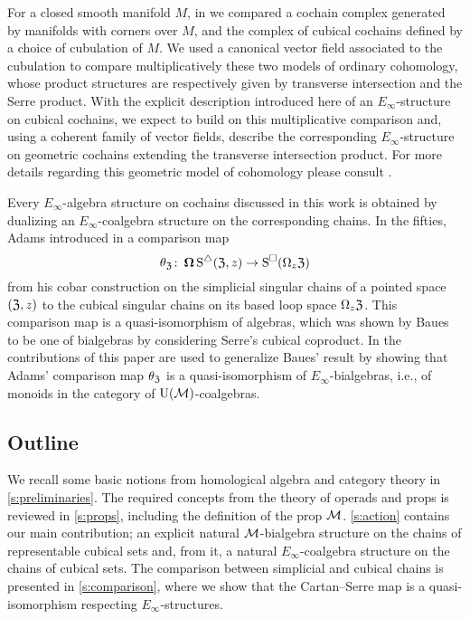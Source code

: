 For a closed smooth manifold $M$, in \cite{medina2021flowing} we compared a cochain complex generated by manifolds with corners over $M$, and the complex of cubical cochains defined by a choice of cubulation of $M$.
We used a canonical vector field associated to the cubulation to compare multiplicatively these two models of ordinary cohomology, whose product structures are respectively given by transverse intersection and the Serre product.
With the explicit description introduced here of an $E_\infty$-structure on cubical cochains, we expect to build on this multiplicative comparison and, using a coherent family of vector fields, describe the corresponding $E_\infty$-structure on geometric cochains extending the transverse intersection product.
For more details regarding this geometric model of cohomology please consult \cite{medina2022foundations}.

Every $E_\infty$-algebra structure on cochains discussed in this work is obtained by dualizing an $E_\infty$-coalgebra structure on the corresponding chains.
In the fifties, Adams introduced in \cite{adams1956cobar} a comparison map
\[
\theta_{\mathfrak{Z}} \colon \operatorname{\mathbf{\Omega}} \operatorname{\operatorname{S}^{\triangle}}(\mathfrak{Z},z) \to \operatorname{\operatorname{S}^{\square}}(\Omega_z \mathfrak{Z})
\]
from his cobar construction on the simplicial singular chains of a pointed space $(\mathfrak{Z},z)$ to the cubical singular chains on its based loop space $\Omega_z \mathfrak{Z}$.
This comparison map is a quasi-isomorphism of algebras, which was shown by Baues \cite{baues1998hopf} to be one of bialgebras by considering Serre's cubical coproduct.
In \cite{medina2021cobar} the contributions of this paper are used to generalize Baues' result by showing that Adams' comparison map $\theta_{\mathfrak{Z}}$ is a quasi-isomorphism of $E_\infty$-bialgebras, i.e., of monoids in the category of ${\operatorname{U}(\mathcal{M})}$-coalgebras.

\subsection*{Outline}

We recall some basic notions from homological algebra and category theory in \cref{s:preliminaries}.
The required concepts from the theory of operads and props is reviewed in \cref{s:props}, including the definition of the prop $\mathcal{M}$.
\cref{s:action} contains our main contribution; an explicit natural $\mathcal{M}$-bialgebra structure on the chains of representable cubical sets and, from it, a natural $E_\infty$-coalgebra structure on the chains of cubical sets.
The comparison between simplicial and cubical chains is presented in \cref{s:comparison}, where we show that the Cartan--Serre map is a quasi-isomorphism respecting $E_\infty$-structures.
